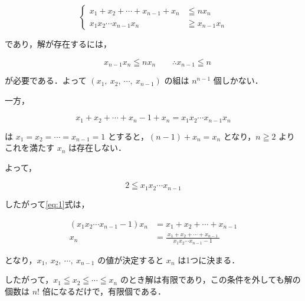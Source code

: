 \documentclass[a4paper]{ltjsarticle}
\begin{document}
\begin{enumerate}[label=(\arabic*)]
          \begin{equation*}
              \left\{\begin{aligned}
                  x_1+x_2+\cdots+x_{n-1}+x_n    & \leqq nx_n         \\
                  x_{1}x_{2}\cdots x_{n-1}x_{n} & \geqq x_{n-1}x_{n}
              \end{aligned}\right.
          \end{equation*}

          であり，解が存在するには，

          \begin{equation*}
              \quad x_{n-1}x_n\leqq nx_n \qquad \therefore x_{n-1}\leqq n
          \end{equation*}

          が必要である．よって $(x_1,\ x_2,\ \cdots,\ x_{n-1})$ の組は $n^{n-1}$ 個しかない．

          一方，

          \begin{equation}
              x_1+x_2+\cdots+x_n-1+x_n=x_{1}x_{2}\cdots x_{n-1}x_{n}\label{eq:1}
          \end{equation}

          は $x_1=x_2=\cdots=x_{n-1}=1$ とすると，$(n-1)+x_n=x_n$ となり，$n\geqq 2$ よりこれを満たす $x_n$ は存在しない．

          よって，

          \begin{equation*}
              2\leqq x_{1}x_{2}\cdots x_{n-1}
          \end{equation*}

          したがって\eqref{eq:1}式は，

          \begin{align*}
              (x_{1}x_{2}\cdots x_{n-1}-1)x_{n} & =x_1+x_2+\cdots+x_{n-1}                                        \\
              x_n                               & =\frac{\ x_1+x_2+\cdots+x_{n-1}\ }{x_{1}x_{2}\cdots x_{n-1}-1}
          \end{align*}

          となり，$x_1,\ x_2,\ \cdots,\ x_{n-1}$ の値が決定すると $x_n$ は1つに決まる．

          したがって，$x_1\leqq x_2\leqq \cdots\leqq x_n$ のとき解は有限であり，この条件を外しても解の個数は $n!$ 倍になるだけで，有限個である．
\end{enumerate}

\end{document}
